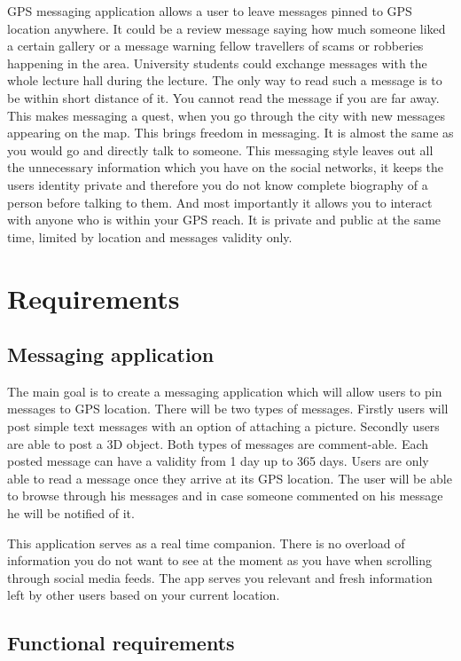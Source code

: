 \documentclass[thesis=M,english]{FITthesis}[2012/10/20]
\begin{document}
GPS messaging application allows a user to leave messages pinned to GPS location anywhere. It could be a review message saying how much someone liked a certain gallery or a message warning fellow travellers of scams or robberies happening in the area. University students could exchange messages with the whole lecture hall during the lecture. The only way to read such a message is to be within short distance of it. You cannot read the message if you are far away. This makes messaging a quest, when you go through the city with new messages appearing on the map. This brings freedom in messaging. It is almost the same as you would go and directly talk to someone. This messaging style leaves out all the unnecessary information which you have on the social networks, it keeps the users identity private and therefore you do not know complete biography of a person before talking to them. And most importantly it allows you to interact with anyone who is within your GPS reach. It is private and public at the same time, limited by location and messages validity only.

\chapter{Requirements}
\section{Messaging application}

The main goal is to create a messaging application which will allow users to pin messages to GPS location. There will be two types of messages. Firstly users will post simple text messages with an option of attaching a picture. Secondly users are able to post a 3D object. Both types of messages are comment-able. Each posted message can have a validity from 1 day up to 365 days. Users are only able to read a message once they arrive at its GPS location. The user will be able to browse through his messages and in case someone commented on his message he will be notified of it.

This application serves as a real time companion. There is no overload of information you do not want to see at the moment as you have when scrolling through social media feeds. The app serves you relevant and fresh information left by other users based on your current location.

\section{Functional requirements}
\end{document}
